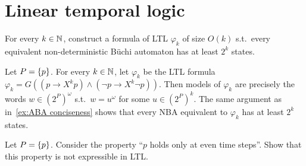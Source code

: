\section*{Linear temporal logic}

\begin{exercise}
	For every $k \in \mathbb N$, construct a formula of LTL $\varphi_k$ of size $O(k)$
	s.t.~every equivalent non-deterministic Büchi automaton has at least $2^k$ states.
\end{exercise}
\begin{solution}
	Let $P = \left\{p\right\}$.
	For every $k \in \mathbb N$, let $\varphi_k$ be the LTL formula
	$\varphi_k = G ((p \to X^k p) \wedge (\neg p \to X^k \neg p))$.
	Then models of $\varphi_k$ are precisely the words $w \in (2^P)^\omega$
	s.t.~$w = u^\omega$ for some $u \in (2^P)^k$.
	The same argument as in~\cref{ex:ABA conciseness}
	shows that every NBA equivalent to $\varphi_k$ has at least $2^k$ states.
\end{solution}

\begin{exercise}
	Let $P = \left\{p\right\}$.
	Consider the property ``$p$ holds only at even time steps''.
	Show that this property is not expressible in LTL.
\end{exercise}

